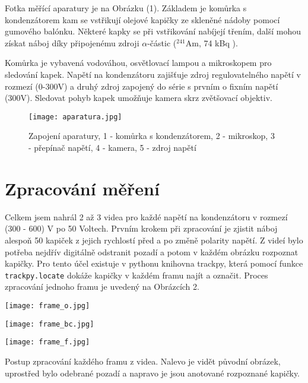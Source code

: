 \documentclass[a4paper,11pt]{article}
\begin{document}
Fotka měřící aparatury je na Obrázku (1). Základem je komůrka s kondenzátorem kam se  vstřikují olejové kapičky ze skleněné nádoby pomocí gumového balónku. Některé kapky se při vstřikování nabíjejí třením, další mohou získat náboj díky připojenému zdroji $ \alpha $-částic  ($ ^{241} $Am, 74 kBq ).

Komůrka je vybavená vodováhou, osvětlovací lampou a mikroskopem pro sledování kapek. Napětí na kondenzátoru zajišťuje zdroj regulovatelného napětí v rozmezí (0-300V) a druhý zdroj zapojený do série s prvním o fixním napětí (300V). Sledovat pohyb kapek umožňuje kamera skrz zvětšovací objektiv. 

\begin{figure}[htpb]
    \centering
    \texttt{[image: aparatura.jpg]}
    \caption{Zapojení aparatury, 1 - komůrka s kondenzátorem, 2 - mikroskop, 3 - přepínač napětí, 4 - kamera, 5 - zdroj napětí}
\end{figure}

\section{Zpracování měření}

Celkem jsem nahrál 2 až 3 videa pro každé napětí na kondenzátoru v rozmezí (300 - 600) V po 50 Voltech. Prvním krokem při zpracování je zjistit náboj alespoň 50 kapiček z jejich rychlostí před a po změně polarity napětí. Z videí bylo potřeba nejdřív digitálně odstranit pozadí a potom v každém obrázku rozpoznat kapičky. Pro tento účel existuje v pythonu knihovna trackpy, která pomocí funkce \texttt{trackpy.locate} dokáže kapičky v každém framu najít a označit. Proces zpracování jednoho framu je uvedený na Obrázcích 2.


\begin{table}[htpb]
    \begin{minipage}{.3\linewidth}
        \centering
        \texttt{[image: frame\_o.jpg]}
    \end{minipage} 
    \hfill
    \begin{minipage}{.3\linewidth}
        \centering
        \texttt{[image: frame\_bc.jpg]}
    \end{minipage} 
    \hfill
    \begin{minipage}{.3\linewidth}
        \centering
        \texttt{[image: frame\_f.jpg]}
    \end{minipage} 
    \hfill
    \captionsetup{type=figure}
    \caption{Postup zpracování každého framu z videa. Nalevo je vidět původní obrázek, uprostřed bylo odebrané pozadí a napravo je jsou anotované rozpoznané kapičky. }
\end{table}
\end{document}
